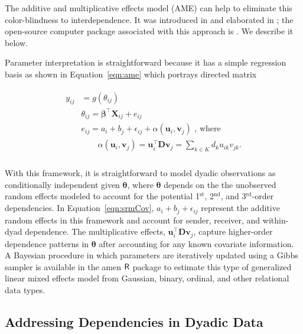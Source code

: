 \documentclass[12pt]{amsart}
\newcommand{\first}{1$^{\text{st}}$}
\newcommand{\second}{2$^{\text{nd}}$}
\newcommand{\third}{3$^{\text{rd}}$}
\newcommand{\pkg}[1]{{\fontseries{b}\selectfont #1}}
\begin{document}
The additive and multiplicative effects model (AME) can help to eliminate this color-blindness to interdependence. It was introduced in \cite{hoff:2008} and elaborated in \cite{hoff:2015}; the open-source computer package associated with this approach is \cite{amenpkg}. We describe it below.

Parameter interpretation is straightforward because it has a simple regression basis as shown in Equation~\ref{eqn:ame} which portrays directed matrix \:

\begin{align}
\begin{aligned}
	y_{ij} &= g(\theta_{ij}) \\
	&\theta_{ij} = \bm\beta^{\top} \mathbf{X}_{ij} + e_{ij} \\
	&e_{ij} = a_{i} + b_{j}  + \epsilon_{ij} + \alpha(\textbf{u}_{i}, \textbf{v}_{j}) \text{  , where } \\
	&\qquad \alpha(\textbf{u}_{i}, \textbf{v}_{j}) = \textbf{u}_{i}^{\top} \textbf{D} \textbf{v}_{j} = \sum_{k \in K} d_{k} u_{ik} v_{jk}. \\
\label{eqn:ame}
\end{aligned}
\end{align}

With this framework, it is straightforward to model dyadic observations as conditionally independent given $\bm\theta$, where $\bm\theta$ depends on the the unobserved random effects modeled to account for the potential \first, \second, and \third-order dependencies. In Equation~\ref{eqn:srmCov}, $a_{i} + b_{j}  + \epsilon_{ij}$ represent the additive random effects in this framework and account for sender, receiver, and within-dyad dependence. The multiplicative effects, $\textbf{u}_{i}^{\top} \textbf{D} \textbf{v}_{j}$, capture higher-order dependence patterns in $\bm\theta$ after accounting for any known covariate information. A Bayesian procedure in which parameters are iteratively updated using a Gibbs sampler is available in the \pkg{amen} $\sf{R}$ package to estimate this type of generalized linear mixed effects model from Gaussian, binary, ordinal, and other relational data types.

\subsection*{\textbf{Addressing Dependencies in Dyadic Data}}
\end{document}
